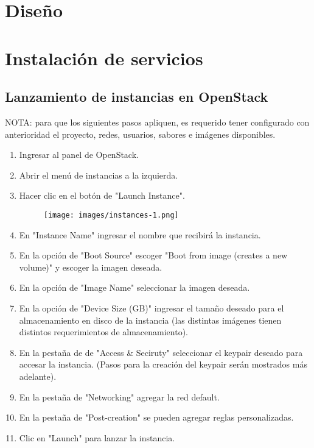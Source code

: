 \documentclass{article}
\begin{document}
\section{Dise\~no}

\section{Instalaci\'on de servicios}
\subsection{Lanzamiento de instancias en OpenStack}
NOTA: para que los siguientes pasos apliquen, es requerido tener configurado con anterioridad el proyecto, redes, usuarios, sabores e im\'agenes disponibles.

\begin{enumerate}
  \item Ingresar al panel de OpenStack.
  \item Abrir el men\'u de instancias a la izquierda.
  \item Hacer clic en el bot\'on de "Launch Instance".
  \begin{figure}[!h]
    \centering
      \texttt{[image: images/instances-1.png]}
    \label{fig:graph}
  \end{figure}
  \item En "Instance Name" ingresar el nombre que recibir\'a la instancia.
  \item En la opci\'on de "Boot Source" escoger "Boot from image (creates a new volume)" y escoger la imagen deseada.
  \item En la opci\'on de "Image Name" seleccionar la imagen deseada.
  \item En la opci\'on de "Device Size (GB)" ingresar el tama\~no deseado para el almacenamiento en disco de la instancia (las distintas im\'agenes tienen distintos requerimientos de almacenamiento).
  \item En la pesta\~na de de "Access \& Seciruty" seleccionar el keypair deseado para accesar la instancia. (Pasos para la creaci\'on del keypair ser\'an mostrados m\'as adelante).
  \item En la pesta\~na de "Networking" agregar la red default.
  \item En la pesta\~na de "Post-creation" se pueden agregar reglas personalizadas.
  \item Clic en "Launch" para lanzar la instancia.
\end{enumerate}
\end{document}
